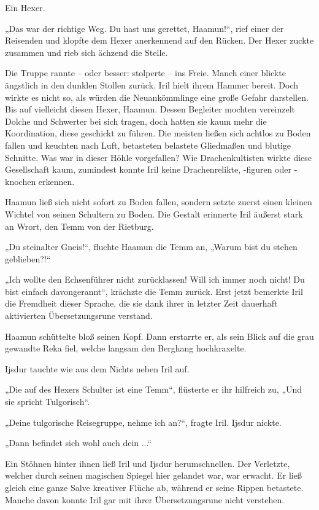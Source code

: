 Ein Hexer.

„Das war der richtige Weg. Du hast uns gerettet, Haamun!“, rief einer der Reisenden und klopfte dem Hexer anerkennend auf den Rücken. Der Hexer zuckte zusammen und rieb sich ächzend die Stelle.

Die Truppe rannte – oder besser: stolperte – ins Freie. Manch einer blickte ängstlich in den dunklen Stollen zurück. Iril hielt ihrem Hammer bereit. Doch wirkte es nicht so, als würden die Neuankömmlinge eine große Gefahr darstellen. Bis auf vielleicht diesen Hexer, Haamun. Dessen Begleiter mochten vereinzelt Dolche und Schwerter bei sich tragen, doch hatten sie kaum mehr die Koordination, diese geschickt zu führen. Die meisten ließen sich achtlos zu Boden fallen und keuchten nach Luft, betasteten belastete Gliedmaßen und blutige Schnitte. Was war in dieser Höhle vorgefallen? Wie Drachenkultisten wirkte diese Gesellschaft kaum, zumindest konnte Iril keine Drachenrelikte, -figuren oder -knochen erkennen.

Haamun ließ sich nicht sofort zu Boden fallen, sondern setzte zuerst einen kleinen Wichtel von seinen Schultern zu Boden. Die Gestalt erinnerte Iril äußerst stark an Wrort, den Temm von der Rietburg.

„Du steinalter Gneis!“, fluchte Haamun die Temm an, „Warum bist du stehen geblieben?!“

„Ich wollte den Echsenführer nicht zurücklassen! Will ich immer noch nicht! Du bist einfach davongerannt“, krächzte die Temm zurück. Erst jetzt bemerkte Iril die Fremdheit dieser Sprache, die sie dank ihrer in letzter Zeit dauerhaft aktivierten Übersetzungsrune verstand.

Haamun schüttelte bloß seinen Kopf. Dann erstarrte er, als sein Blick auf die grau gewandte Reka fiel, welche langsam den Berghang hochkraxelte.

Ijsdur tauchte wie aus dem Nichts neben Iril auf.

„Die auf des Hexers Schulter ist eine Temm“, flüsterte er ihr hilfreich zu, „Und sie spricht Tulgorisch“.

„Deine tulgorische Reisegruppe, nehme ich an?“, fragte Iril. Ijsdur nickte.

„Dann befindet sich wohl auch dein ...“

Ein Stöhnen hinter ihnen ließ Iril und Ijsdur herumschnellen. Der Verletzte, welcher durch seinen magischen Spiegel hier gelandet war, war erwacht. Er ließ gleich eine ganze Salve kreativer Flüche ab, während er seine Rippen betastete. Manche davon konnte Iril gar mit ihrer Übersetzungsrune nicht verstehen.

